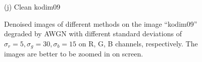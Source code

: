 \documentclass[10pt,onecolumn,letterpaper]{article}
\begin{document}
\begin{figure}
{\begin{minipage}[t]{0.195\textwidth}
{\footnotesize (j) Clean kodim09}
\end{minipage}
}
\caption{Denoised images of different methods on the image ``kodim09'' degraded by AWGN with different standard deviations of $\sigma_{r}=5, \sigma_{g}=30, \sigma_{b}=15$ on R, G, B channels, respectively. The images are better to be zoomed in on screen.}
\label{f1}
\vspace{2mm}
\end{figure}


\begin{figure}\vspace{1mm}
\centering
{}
\end{figure}
\end{document}
